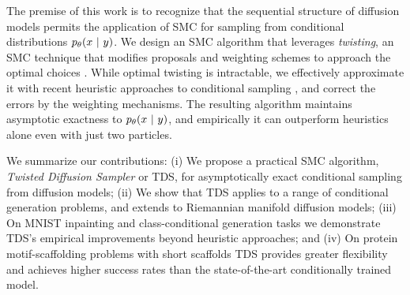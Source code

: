 The premise of this work is to recognize that the sequential structure of diffusion models permits the application of SMC for sampling from conditional distributions $p_{\theta}(x ~\vert~ y)$.
We design an SMC algorithm that leverages \emph{twisting},
an SMC technique that modifies proposals and weighting schemes to approach the optimal choices \citep{ guarniero2017iterated,whiteley2014twisted}.
While optimal twisting is intractable, we effectively approximate it with recent heuristic approaches to conditional sampling \citep[eg.][]{hovideo},
and correct the errors by the weighting mechanisms. 
The resulting algorithm maintains asymptotic exactness to $p_{\theta} (x ~\vert~ y)$, and empirically it can outperform heuristics alone even with just two particles.

We summarize our contributions: 
(i) We propose a practical SMC algorithm, \emph{Twisted Diffusion Sampler} or TDS,  for asymptotically exact conditional sampling from diffusion models; 
(ii) We show that TDS applies to a range of conditional generation problems, and extends to Riemannian manifold diffusion models; 
(iii) On MNIST inpainting and class-conditional generation tasks we demonstrate TDS's empirical improvements beyond heuristic approaches; and  
(iv) On protein motif-scaffolding problems with short scaffolds TDS provides greater flexibility and achieves higher success rates than the state-of-the-art conditionally trained model. 

